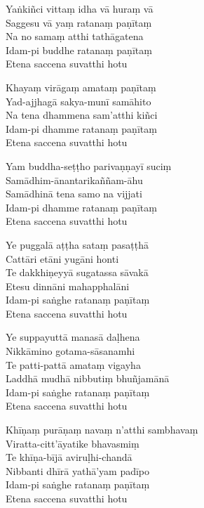 \begin{paritta}

Yaṅkiñci vittaṃ idha vā huraṃ vā\\
Saggesu vā yaṃ ratanaṃ paṇītaṃ\\
Na no samaṃ atthi tathāgatena\\
Idam-pi buddhe ratanaṃ paṇītaṃ\\
Etena saccena suvatthi hotu

Khayaṃ virāgaṃ amataṃ paṇītaṃ\\
Yad-ajjhagā sakya-munī samāhito\\
Na tena dhammena sam'atthi kiñci\\
Idam-pi dhamme ratanaṃ paṇītaṃ\\
Etena saccena suvatthi hotu

Yam buddha-seṭṭho parivaṇṇayī suciṃ\\
Samādhim-ānantarikaññam-āhu\\
Samādhinā tena samo na vijjati\\
Idam-pi dhamme ratanaṃ paṇītaṃ\\
Etena saccena suvatthi hotu

Ye puggalā aṭṭha sataṃ pasaṭṭhā\\
Cattāri etāni yugāni honti\\
Te dakkhiṇeyyā sugatassa sāvakā\\
Etesu dinnāni mahapphalāni\\
Idam-pi saṅghe ratanaṃ paṇītaṃ\\
Etena saccena suvatthi hotu

Ye suppayuttā manasā daḷhena\\
Nikkāmino gotama-sāsanamhi\\
Te patti-pattā amataṃ vigayha\\
Laddhā mudhā nibbutiṃ bhuñjamānā\\
Idam-pi saṅghe ratanaṃ paṇītaṃ\\
Etena saccena suvatthi hotu

Khīṇaṃ purāṇaṃ navaṃ n'atthi sambhavaṃ\\
Viratta-citt'āyatike bhavasmiṃ\\
Te khīṇa-bījā aviruḷhi-chandā\\
Nibbanti dhīrā yathā'yam padīpo\\
Idam-pi saṅghe ratanaṃ paṇītaṃ\\
Etena saccena suvatthi hotu

\end{paritta}

